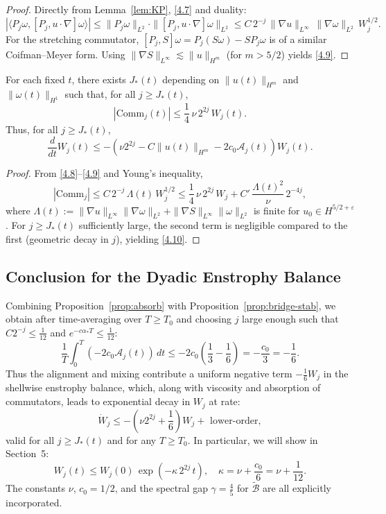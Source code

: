 \documentclass[11pt]{article}
\begin{document}
\begin{proof}
Directly from Lemma~\ref{lem:KP}, \eqref{4.7} and duality:
\[
|\langle P_j \omega, [P_j, u \cdot \nabla] \omega \rangle| \leq \|P_j \omega\|_{L^2} \cdot \|[P_j, u \cdot \nabla] \omega\|_{L^2} \leq C \, 2^{-j} \, \|\nabla u\|_{L^\infty} \, \|\nabla \omega\|_{L^2} \, W_j^{1/2}.
\]
For the stretching commutator, $[P_j, S] \omega = P_j (S \omega) - S P_j\omega$ is of a similar Coifman--Meyer form. Using $\|\nabla S\|_{L^\infty} \lesssim \|u\|_{H^m}$ (for $m > 5/2$) yields \eqref{4.9}.
\end{proof}

\begin{proposition} \label{prop:absorb}
For each fixed $t$, there exists $J_*(t)$ depending on $\|u(t)\|_{H^m}$ and $\|\omega(t)\|_{H^1}$ such that, for all $j \geq J_*(t)$,
\begin{equation}
|\mathrm{Comm}_j(t)| \leq \frac{1}{4} \, \nu \, 2^{2j} \, W_j(t). \tag{4.10}
\end{equation}
Thus, for all $j \geq J_*(t)$,
\[
\frac{d}{dt} W_j(t) \leq - \left( \nu 2^{2j} - C \|u(t)\|_{H^m} - 2 c_0 \mathcal{A}_j(t) \right) W_j(t). \tag{4.11}
\]
\end{proposition}

\begin{proof}
From \eqref{4.8}--\eqref{4.9} and Young’s inequality,
\[
|\mathrm{Comm}_j| \leq C \, 2^{-j} \, \Lambda(t) \, W_j^{1/2} \leq \frac{1}{4} \, \nu \, 2^{2j} \, W_j + C' \, \frac{\Lambda(t)^2}{\nu} \, 2^{-4j},
\]
where $\Lambda(t) := \|\nabla u\|_{L^\infty}\|\nabla\omega\|_{L^2} + \|\nabla S\|_{L^\infty} \|\omega\|_{L^2}$ is finite for $u_0 \in H^{5/2+\varepsilon}$. For $j \geq J_*(t)$ sufficiently large, the second term is negligible compared to the first (geometric decay in $j$), yielding \eqref{4.10}.
\end{proof}

\subsection{Conclusion for the Dyadic Enstrophy Balance}

Combining Proposition~\ref{prop:absorb} with Proposition~\ref{prop:bridge-stab}, we obtain after time-averaging over $T \geq T_0$ and choosing $j$ large enough such that $C 2^{-j} \leq \frac{1}{12}$ and $e^{-c \alpha_* T} \leq \frac{1}{12}$:
\[
\frac{1}{T} \int_0^T \left( -2 c_0 \mathcal{A}_j(t) \right) \, dt \leq - 2 c_0 \left( \frac{1}{3} - \frac{1}{6} \right) = - \frac{c_0}{3} = - \frac{1}{6}. \tag{4.12}
\]
Thus the alignment and mixing contribute a uniform negative term $- \frac{1}{6} W_j$ in the shellwise enstrophy balance, which, along with viscosity and absorption of commutators, leads to exponential decay in $W_j$ at rate:
\[
\dot{W}_j \leq - \left( \nu 2^{2j} + \frac{1}{6} \right) W_j + \text{ lower-order}, \tag{4.13}
\]
valid for all $j \geq J_*(t)$ and for any $T \geq T_0$. In particular, we will show in Section~5:
\[
W_j(t) \leq W_j(0) \, \exp\!\left( - \kappa \, 2^{2j} \, t \right), \quad \kappa = \nu + \frac{c_0}{6} = \nu + \frac{1}{12}. \tag{4.14}
\]
The constants $\nu$, $c_0 = 1/2$, and the spectral gap $\gamma = \frac{4}{5}$ for $\tilde{\mathcal{B}}$ are all explicitly incorporated.
\end{document}
